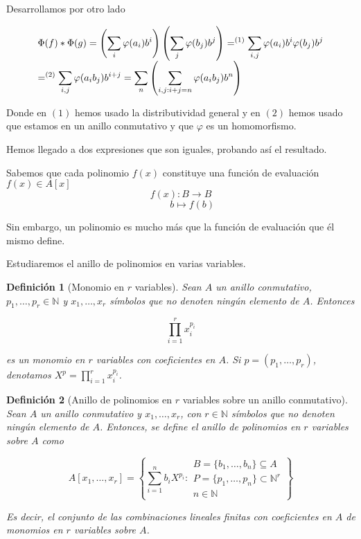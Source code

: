 \documentclass[11pt, a4paper, titlepage]{article}
\makeatletter
\newif\IfInSansMode
\let\oldsf\sffamily
\renewcommand*{\sffamily}{\oldsf\mathversion{sans}\InSansModetrue}
\let\oldnorm\normalfont
\renewcommand*{\normalfont}{\oldnorm\InSansModefalse\mathversion{normal}}
\renewenvironment{proof}[1][\proofname] {\vspace{-15pt}\par\pushQED{\qed}\normalfont\topsep6\p@\@plus6\p@\relax\trivlist\item[\hskip\labelsep\it#1\@addpunct{.}]\ignorespaces}{\popQED\endtrivlist\@endpefalse}
\renewenvironment{proof}[1][\proofname] {\par\pushQED{\qed}\normalfont\topsep6\p@\@plus6\p@\relax\trivlist\item[\hskip\labelsep\itshape\sffamily#1\@addpunct{.}]\ignorespaces}{\popQED\endtrivlist\@endpefalse}
\theoremstyle{theorem-style}
\theoremstyle{definition-style}
\newtheorem{ndef}{Definición}[section]
\theoremstyle{remark-style}
\theoremstyle{example-style}
\makeatother
\begin{document}
\begin{proof}
 Desarrollamos por otro lado

 \[
 \begin{array}{>{\displaystyle}l}
   \Phi(f) * \Phi(g) = \left(\sum_i \varphi(a_i)b^i\right)\left(\sum_j \varphi(b_j)b^j\right) =^{(1)} \sum_{i,j} \varphi(a_i)b^i\varphi(b_j)b^j \\
   =^{(2)} \sum_{i,j} \varphi(a_ib_j)b^{i+j} = \sum_n\left(\sum_{i,j: i+j = n} \varphi(a_ib_j)b^n\right)
 \end{array}
 \]

 Donde en $(1)$ hemos usado la distributividad general y en $(2)$ hemos usado que estamos en un anillo conmutativo y que $\varphi$ es un homomorfismo.

 Hemos llegado a dos expresiones que son iguales, probando así el resultado.

\end{proof}


Sabemos que cada polinomio $f(x)$ constituye una función de evaluación $f(x) \in A[x]$
\[
f(x):B \to B
\]
\[
\hspace{1cm}b \mapsto f(b)
\]

Sin embargo, un polinomio es mucho más que la función de evaluación que él mismo define.

Estudiaremos el anillo de polinomios en varias variables.

\begin{ndef}[Monomio en $r$ variables]
  Sean $A$ un anillo conmutativo, $p_1, \dots, p_r \in \mathbb{N}$ y $x_1, \dots, x_r$ símbolos que no denoten ningún elemento de $A$.
  Entonces

  \[
      \prod_{i=1}^r x_i^{p_i}
  \]

  es un monomio en $r$ variables con coeficientes en $A$. Si $p = (p_1, \dots, p_r)$, denotamos $X^p = \prod_{i=1}^r x_i^{p_i}$.
\end{ndef}

\begin{ndef}[Anillo de polinomios en $r$ variables sobre un anillo conmutativo]
  Sean $A$ un anillo conmutativo y $x_1, \dots, x_r$, con $r \in \mathbb{N}$ símbolos que no denoten ningún elemento de $A$. Entonces, se define el anillo de polinomios en
  $r$ variables sobre $A$ como

  \[
      A[x_1, \dots, x_r] = \left\{ \sum_{i=1}^n b_iX^{p_i} :
      \begin{array}{l}
        B = \{b_1, \dots, b_n\} \subseteq A \\
        P = \{p_1, \dots, p_n\} \subset \mathbb{N}^r \\
        n \in \mathbb{N}
      \end{array} \right\}
   \]

      Es decir, el conjunto de las combinaciones lineales finitas con coeficientes en $A$ de monomios en $r$ variables sobre $A$.
\end{ndef}
\end{document}
